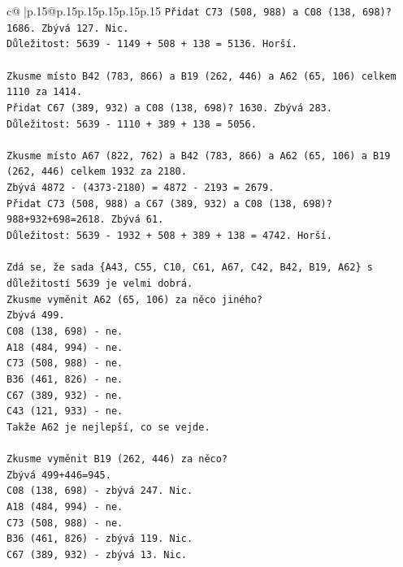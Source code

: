 \documentclass{article}
\begin{document}
{\begin{supertabular}{c@{$\;$}|p{.15\linewidth}@{}p{.15\linewidth}p{.15\linewidth}p{.15\linewidth}p{.15\linewidth}p{.15\linewidth}}
{{{\texttt{Přidat C73 (508, 988) a C08 (138, 698)? 1686. Zbývá 127. Nic.} \\
\texttt{Důležitost: 5639 {-} 1149 + 508 + 138 = 5136. Horší.} \\
\\ 
\texttt{Zkusme místo B42 (783, 866) a B19 (262, 446) a A62 (65, 106) celkem 1110 za 1414.} \\
\texttt{Přidat C67 (389, 932) a C08 (138, 698)? 1630. Zbývá 283.} \\
\texttt{Důležitost: 5639 {-} 1110 + 389 + 138 = 5056.} \\
\\ 
\texttt{Zkusme místo A67 (822, 762) a B42 (783, 866) a A62 (65, 106) a B19 (262, 446) celkem 1932 za 2180.} \\
\texttt{Zbývá 4872 {-} (4373{-}2180) = 4872 {-} 2193 = 2679.} \\
\texttt{Přidat C73 (508, 988) a C67 (389, 932) a C08 (138, 698)? 988+932+698=2618. Zbývá 61.} \\
\texttt{Důležitost: 5639 {-} 1932 + 508 + 389 + 138 = 4742. Horší.} \\
\\ 
\texttt{Zdá se, že sada \{A43, C55, C10, C61, A67, C42, B42, B19, A62\} s důležitostí 5639 je velmi dobrá.} \\
\texttt{Zkusme vyměnit A62 (65, 106) za něco jiného?} \\
\texttt{Zbývá 499.} \\
\texttt{C08 (138, 698) {-} ne.} \\
\texttt{A18 (484, 994) {-} ne.} \\
\texttt{C73 (508, 988) {-} ne.} \\
\texttt{B36 (461, 826) {-} ne.} \\
\texttt{C67 (389, 932) {-} ne.} \\
\texttt{C43 (121, 933) {-} ne.} \\
\texttt{Takže A62 je nejlepší, co se vejde.} \\
\\ 
\texttt{Zkusme vyměnit B19 (262, 446) za něco?} \\
\texttt{Zbývá 499+446=945.} \\
\texttt{C08 (138, 698) {-} zbývá 247. Nic.} \\
\texttt{A18 (484, 994) {-} ne.} \\
\texttt{C73 (508, 988) {-} ne.} \\
\texttt{B36 (461, 826) {-} zbývá 119. Nic.} \\
\texttt{C67 (389, 932) {-} zbývá 13. Nic.} \\
}}}
\end{supertabular}}
\end{document}

